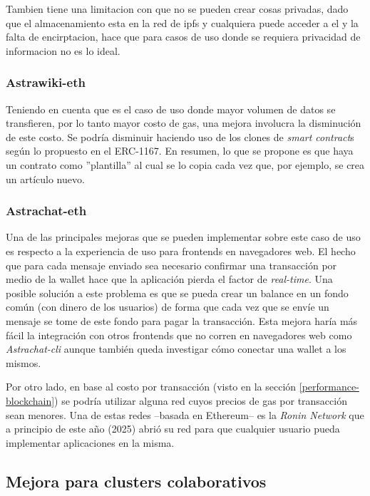 Tambien tiene una limitacion con que no se pueden crear cosas privadas, dado que el almacenamiento esta en la red de ipfs y cualquiera puede acceder a el y la falta de encirptacion, hace que para casos de uso donde se requiera privacidad de informacion no es lo ideal.

\subsubsection{Astrawiki-eth}

Teniendo en cuenta que es el caso de uso donde mayor volumen de datos se transfieren, por lo tanto mayor costo de gas, una mejora involucra la disminución de este costo. Se podría disminuir haciendo uso de los clones de \textit{smart contract}s según lo propuesto en el ERC-1167\cite{erc-1167}. En resumen, lo que se propone es que haya un contrato como ''plantilla'' al cual se lo copia cada vez que, por ejemplo, se crea un artículo nuevo.

\subsubsection{Astrachat-eth}

Una de las principales mejoras que se pueden implementar sobre este caso de uso es respecto a la experiencia de uso para frontends en navegadores web. El hecho que para cada mensaje enviado sea necesario confirmar una transacción por medio de la wallet hace que la aplicación pierda el factor de \textit{real-time}. Una posible solución a este problema es que se pueda crear un balance en un fondo común (con dinero de los usuarios) de forma que cada vez que se envíe un mensaje se tome de este fondo para pagar la transacción. Esta mejora haría más fácil la integración con otros frontends que no corren en navegadores web como \textit{Astrachat-cli} aunque también queda investigar cómo conectar una wallet a los mismos.

Por otro lado, en base al costo por transacción (visto en la sección \ref{performance-blockchain}) se podría utilizar alguna red cuyos precios de gas por transacción sean menores. Una de estas redes --basada en Ethereum-- es la \textit{Ronin Network}\cite{ronin-network}\cite{ronin-network-whitepaper} que a principio de este año (2025) abrió su red para que cualquier usuario pueda implementar aplicaciones en la misma.

\subsection{Mejora para clusters colaborativos}


